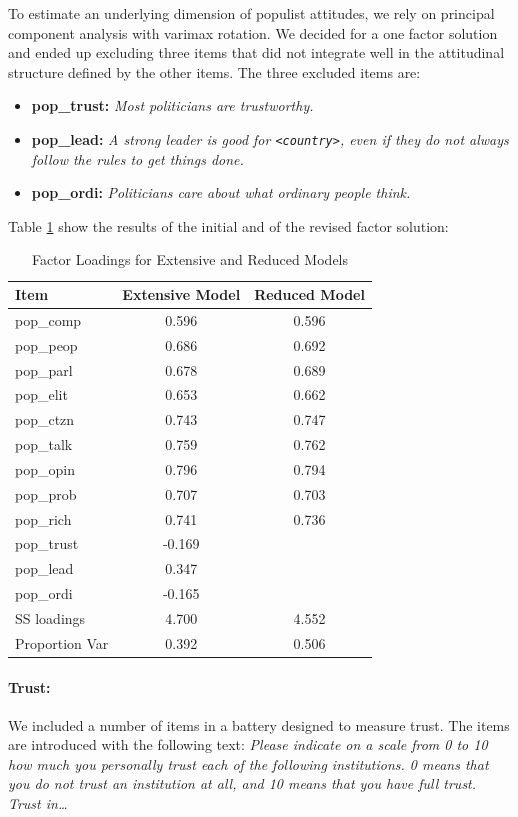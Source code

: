 \documentclass[12pt]{article}
\begin{document}
To estimate an underlying dimension of populist attitudes, we rely on principal component analysis with varimax rotation. We decided for a one factor solution and ended up excluding three items that did not integrate well in the attitudinal structure defined by the other items. The three excluded items are:
\begin{itemize}
  \item \textbf{pop\_trust:} \textit{Most politicians are trustworthy.}
  \item \textbf{pop\_lead:} \textit{A strong leader is good for \texttt{<country>}, even if they do not always follow the rules to get things done.}
  \item \textbf{pop\_ordi:} \textit{Politicians care about what ordinary people think.}
\end{itemize}
Table \ref{populist_factor_loadings} show the results of the initial and of the revised factor solution:

\begin{table}[ht]
\centering
\caption{Factor Loadings for Extensive and Reduced Models}
\label{populist_factor_loadings}
\begin{tabular}{lcc}
\hline
\textbf{Item} & \textbf{Extensive Model} & \textbf{Reduced Model} \\
\hline
pop\_comp   & 0.596  & 0.596 \\
pop\_peop   & 0.686  & 0.692 \\
pop\_parl   & 0.678  & 0.689 \\
pop\_elit   & 0.653  & 0.662 \\
pop\_ctzn   & 0.743  & 0.747 \\
pop\_talk   & 0.759  & 0.762 \\
pop\_opin   & 0.796  & 0.794 \\
pop\_prob   & 0.707  & 0.703 \\
pop\_rich   & 0.741  & 0.736 \\
pop\_trust  & -0.169 &  \\[1mm]
pop\_lead   & 0.347  &  \\[1mm]
pop\_ordi   & -0.165 &  \\
\hline
SS loadings     & 4.700  & 4.552 \\
Proportion Var  & 0.392  & 0.506 \\
\hline
\end{tabular}
\end{table}

\paragraph{Trust:}
We included a number of items in a battery designed to measure trust. The items are introduced with the following text: \textit{Please indicate on a scale from 0 to 10 how much you personally trust each of the following institutions. 0 means that you do not trust an institution at all, and 10 means that you have full trust. Trust in…}
\end{document}

